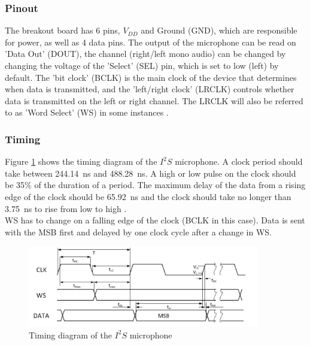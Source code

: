 \subsubsection{Pinout}

The breakout board has 6 pins, $V_{DD}$ and Ground (GND), which are responsible for power, as well as 4 data pins.
The output of the microphone can be read on 'Data Out' (DOUT), the channel (right/left mono audio) can be changed by
changing the voltage of the 'Select' (SEL) pin, which is set to low (left) by default.
The 'bit clock' (BCLK) is the main clock of the device that determines when data is transmitted, and the 'left/right clock' (LRCLK)
controls whether data is transmitted on the left or right channel.
The LRCLK will also be referred to as 'Word Select' (WS) in some instances \cite{i2s_mic_pinout}.

\subsubsection{Timing}

Figure \ref{fig:i2s_timing} shows the timing diagram of the $I^2S$ microphone.
A clock period should take between \SI{244.14}{\nano\second} and \SI{488.28}{\nano\second}.
A high or low pulse on the clock should be 35\% of the duration of a period.
The maximum delay of the data from a rising edge of the clock should be \SI{65.92}{\nano\second}
and the clock should take no longer than \SI{3.75}{\nano\second} to rise from low to high \cite{i2s_mic_datasheet}.
\\
WS has to change on a falling edge of the clock (BCLK in this case).
Data is sent with the MSB first and delayed by one clock cycle after a change in WS.

\begin{figure}[htb]
    \centering
    \includegraphics[width=0.9\textwidth]{figures/i2s_timing.png}
    \caption[Timing diagram of the SPH0645LM4H-B $I^2S$ mic \cite{i2s_mic_datasheet}]{Timing diagram of the $I^2S$ microphone}
    \label{fig:i2s_timing}
\end{figure}

